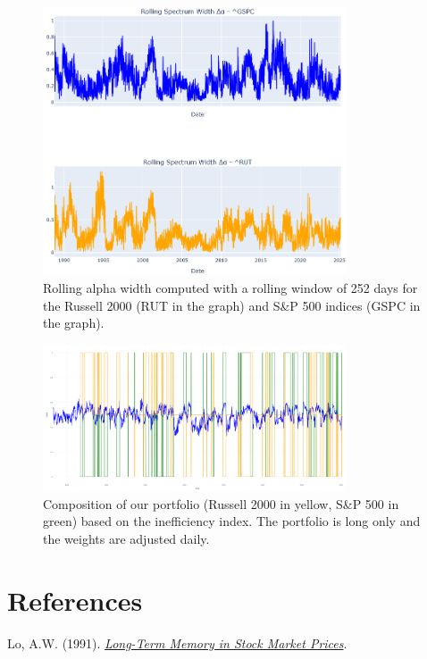 \documentclass[11pt]{extarticle}
\begin{document}
\begin{figure}[ht]
    \centering
    \includegraphics[width=0.8\textwidth]{img/rolling_alpha_width.png}
    \caption{Rolling alpha width computed with a rolling window of 252 days
        for the Russell 2000 (RUT in the graph) and S\&P 500 indices (GSPC in the graph).}
    \label{fig:rolling_alpha_width}
\end{figure}
\FloatBarrier


\begin{figure}[ht]
    \centering
    \includegraphics[width=0.8\textwidth]{img/position_switching.png}
    \caption{Composition of our portfolio
        (Russell 2000 in yellow, S\&P 500 in green) based on the inefficiency index.
        The portfolio is long only and the weights are adjusted daily.}
    \label{fig:position_switching}
\end{figure}
\FloatBarrier

\section{References}

Lo, A.W. (1991). \textit{\href{http://www.e-m-h.org/Lo\_\_91.pdf}{Long-Term Memory in Stock Market Prices}}. \\
\end{document}
